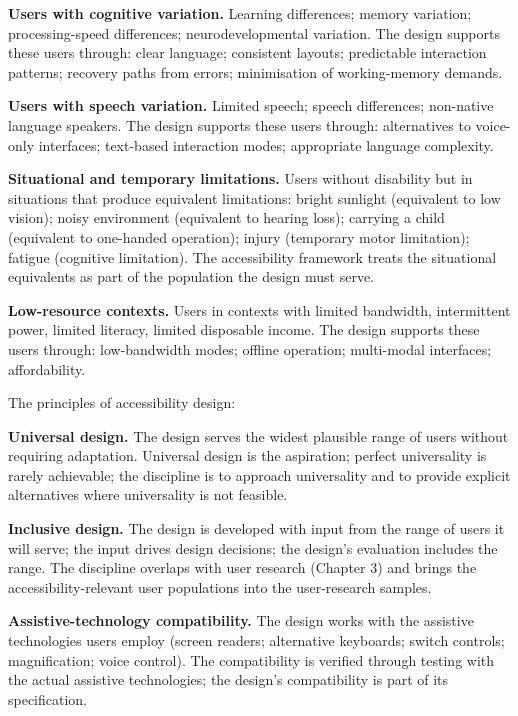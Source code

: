 \textbf{Users with cognitive variation.} Learning differences; memory variation; processing-speed differences; neurodevelopmental variation. The design supports these users through: clear language; consistent layouts; predictable interaction patterns; recovery paths from errors; minimisation of working-memory demands.

\textbf{Users with speech variation.} Limited speech; speech differences; non-native language speakers. The design supports these users through: alternatives to voice-only interfaces; text-based interaction modes; appropriate language complexity.

\textbf{Situational and temporary limitations.} Users without disability but in situations that produce equivalent limitations: bright sunlight (equivalent to low vision); noisy environment (equivalent to hearing loss); carrying a child (equivalent to one-handed operation); injury (temporary motor limitation); fatigue (cognitive limitation). The accessibility framework treats the situational equivalents as part of the population the design must serve.

\textbf{Low-resource contexts.} Users in contexts with limited bandwidth, intermittent power, limited literacy, limited disposable income. The design supports these users through: low-bandwidth modes; offline operation; multi-modal interfaces; affordability.

The principles of accessibility design:

\textbf{Universal design.} The design serves the widest plausible range of users without requiring adaptation. Universal design is the aspiration; perfect universality is rarely achievable; the discipline is to approach universality and to provide explicit alternatives where universality is not feasible.

\textbf{Inclusive design.} The design is developed with input from the range of users it will serve; the input drives design decisions; the design's evaluation includes the range. The discipline overlaps with user research (Chapter 3) and brings the accessibility-relevant user populations into the user-research samples.

\textbf{Assistive-technology compatibility.} The design works with the assistive technologies users employ (screen readers; alternative keyboards; switch controls; magnification; voice control). The compatibility is verified through testing with the actual assistive technologies; the design's compatibility is part of its specification.

